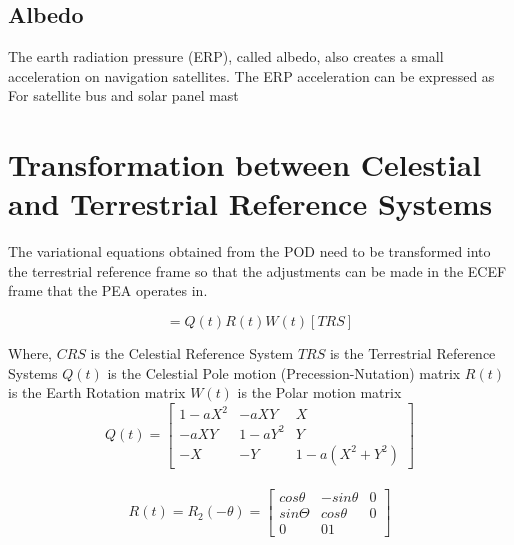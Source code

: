 \subsection{Albedo}
The earth radiation pressure (ERP), called albedo, also creates a small acceleration on navigation satellites. The ERP acceleration can be expressed as
For satellite bus and solar panel mast



\section{Transformation between Celestial and Terrestrial Reference Systems}

The variational equations obtained from the POD need to be transformed into the terrestrial reference frame so that the adjustments can be made in the ECEF frame that the PEA operates in.

\begin{equation}
    [CRS] = Q(t)R(t)W(t)[TRS]
\end{equation}

Where,
$CRS$ is the Celestial Reference System
$TRS$ is the Terrestrial Reference Systems
$Q(t)$ is the Celestial Pole motion (Precession-Nutation) matrix
$R(t)$ is the Earth Rotation matrix
$W(t)$ is the Polar motion matrix
\\
\begin{equation}
Q(t) = 
\begin{bmatrix} 
1-aX^2  & -aXY     & X \\
 -aXY   & 1 - aY^2 & Y \\
 -X     & -Y       & 1-a(X^2+Y^2) 
\end{bmatrix}
\end{equation}
\\
\begin{equation}
R(t) = R_2(-\theta) = 
\begin{bmatrix}
cos \theta & -sin \theta & 0 \\
sin \Theta & cos \theta  & 0 \\
0 & 0 1
\end{bmatrix}
\end{equation}




